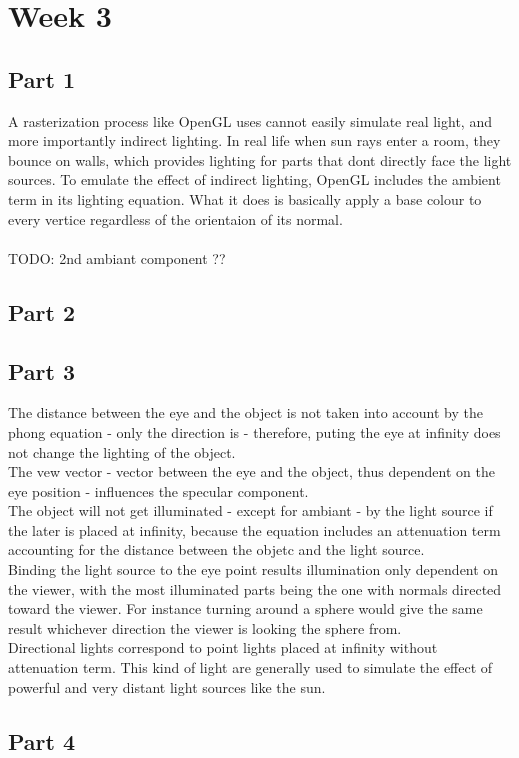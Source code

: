 \chapter{Week 3}

\section{Part 1}

A rasterization process like OpenGL uses cannot easily simulate real light, and
more importantly indirect lighting. In real life when sun rays enter a room, they
bounce on walls, which provides lighting for parts that dont directly face the light
sources. To emulate the effect of indirect lighting, OpenGL includes the ambient
term in its lighting equation. What it does is basically apply a base colour to
every vertice regardless of the orientaion of its normal. 
~\\
~\\
TODO: 2nd ambiant component ??


\section{Part 2}

\section{Part 3}
The distance between the eye and the object is not taken into account by the phong
equation - only the direction is - therefore, puting the eye at infinity does not
change the lighting of the object.\\
The vew vector - vector between the eye and the object, thus dependent on the
eye position - influences the specular component.\\
The object will not get illuminated - except for ambiant - by the light source if the later is placed at
infinity, because the equation includes an attenuation term accounting for the
distance between the objetc and the light source.\\
Binding the light source to the eye point results illumination only dependent on
the viewer, with the most illuminated parts being the one with normals directed
toward the viewer. For instance turning around a sphere would give the same
result whichever direction the viewer is looking the sphere from.\\
Directional lights correspond to point lights placed at infinity without attenuation
term. This kind of light are generally used to simulate the effect of powerful
and very distant light sources like the sun.\\

\section{Part 4}

